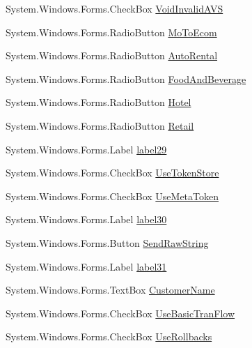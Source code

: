 \begin{DoxyCompactItemize}
\item 
System.\+Windows.\+Forms.\+Check\+Box \mbox{\hyperlink{class_form_sim_1_1_form1_aa0f74345c5136c35a702e5670cac3f3b}{Void\+Invalid\+A\+VS}}
\item 
System.\+Windows.\+Forms.\+Radio\+Button \mbox{\hyperlink{class_form_sim_1_1_form1_ac5c7fdaade4547605b5252b96334d107}{Mo\+To\+Ecom}}
\item 
System.\+Windows.\+Forms.\+Radio\+Button \mbox{\hyperlink{class_form_sim_1_1_form1_ad54c2a3dd2e3bc42c89b1f274e20bf11}{Auto\+Rental}}
\item 
System.\+Windows.\+Forms.\+Radio\+Button \mbox{\hyperlink{class_form_sim_1_1_form1_a5aaef580c721c58b391c31253d543ece}{Food\+And\+Beverage}}
\item 
System.\+Windows.\+Forms.\+Radio\+Button \mbox{\hyperlink{class_form_sim_1_1_form1_a0960c5bf8f82f7c1486da7d14b32cad8}{Hotel}}
\item 
System.\+Windows.\+Forms.\+Radio\+Button \mbox{\hyperlink{class_form_sim_1_1_form1_a5fdf9a5bfd8218662d2bec76b6b103b5}{Retail}}
\item 
System.\+Windows.\+Forms.\+Label \mbox{\hyperlink{class_form_sim_1_1_form1_a6344870b90caee4d8318e2748cc31763}{label29}}
\item 
System.\+Windows.\+Forms.\+Check\+Box \mbox{\hyperlink{class_form_sim_1_1_form1_a92373dcafbe3831980547e7b2c8aafb7}{Use\+Token\+Store}}
\item 
System.\+Windows.\+Forms.\+Check\+Box \mbox{\hyperlink{class_form_sim_1_1_form1_aa4f20d51107c4775cbe7f568638a1823}{Use\+Meta\+Token}}
\item 
System.\+Windows.\+Forms.\+Label \mbox{\hyperlink{class_form_sim_1_1_form1_ad2abdc434aaaf8a792447d008a21fbe2}{label30}}
\item 
System.\+Windows.\+Forms.\+Button \mbox{\hyperlink{class_form_sim_1_1_form1_a05953f1ae0702a0c19d215571d6e63b7}{Send\+Raw\+String}}
\item 
System.\+Windows.\+Forms.\+Label \mbox{\hyperlink{class_form_sim_1_1_form1_a950f80344811da3c7bc0f6846db75fbe}{label31}}
\item 
System.\+Windows.\+Forms.\+Text\+Box \mbox{\hyperlink{class_form_sim_1_1_form1_a508d427416f6dfb6a073293da2853ab0}{Customer\+Name}}
\item 
System.\+Windows.\+Forms.\+Check\+Box \mbox{\hyperlink{class_form_sim_1_1_form1_a031d77f0edc11783639640c5926222de}{Use\+Basic\+Tran\+Flow}}
\item 
System.\+Windows.\+Forms.\+Check\+Box \mbox{\hyperlink{class_form_sim_1_1_form1_a182b08b8cb893b9744845831b79c6fbd}{Use\+Rollbacks}}

\end{DoxyCompactItemize}
